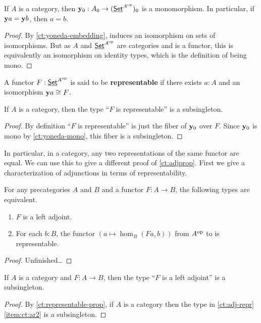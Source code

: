 \begin{cor}\label{ct:yoneda-mono}
  If $A$ is a category, then $\mathbf{y}_0 : A_0 \to (\underline{\mathsf{Set}}^{A^{\textrm{op}}})_0$ is a monomorphism.
  In particular, if $\mathbf{y} a = \mathbf{y} b$, then $a=b$.
\end{cor}
\begin{proof}
  By \autoref{ct:yoneda-embedding}, \y induces an isomorphism on sets of isomorphisms.
  But as $A$ and $\underline{\mathsf{Set}}^{A^{\textrm{op}}}$ are categories and \y is a functor, this is equivalently an isomorphism on identity types, which is the definition of being mono.
\end{proof}

\begin{defn}\label{ct:representable}
  A functor $F:\underline{\mathsf{Set}}^{A^{\textrm{op}}}$ is said to be \textbf{representable} if there exists $a:A$ and an isomorphism $\mathbf{y} a \cong F$.
\end{defn}

\begin{thm}\label{ct:representable-prop}
  If $A$ is a category, then the type ``$F$ is representable'' is a subsingleton.
\end{thm}
\begin{proof}
  By definition ``$F$ is representable'' is just the fiber of $\mathbf{y}_0$ over $F$.
  Since $\mathbf{y}_0$ is mono by \autoref{ct:yoneda-mono}, this fiber is a subsingleton.
\end{proof}

In particular, in a category, any two representations of the same functor are equal.
We can use this to give a different proof of \autoref{ct:adjprop}.
First we give a characterization of adjunctions in terms of representability.

\begin{lem}\label{ct:adj-repr}
  For any precategories $A$ and $B$ and a functor $F:A\to B$, the following types are equivalent.
  \begin{enumerate}
  \item $F$ is a left adjoint.\label{item:ct:ar1}
  \item For each $b:B$, the functor $(a \mapsto \hom_B(Fa,b))$ from $A^{\textrm{op}}$ to \uset is representable.\label{item:ct:ar2}
  \end{enumerate}
\end{lem}
\begin{proof}
  Unfinished\dots
\end{proof}

\begin{cor}\label{ct:adjprop2}
  If $A$ is a category and $F:A\to B$, then the type ``$F$ is a left adjoint'' is a subsingleton.
\end{cor}
\begin{proof}
  By \autoref{ct:representable-prop}, if $A$ is a category then the type in \autoref{ct:adj-repr}\ref{item:ct:ar2} is a subsingleton.
\end{proof}


